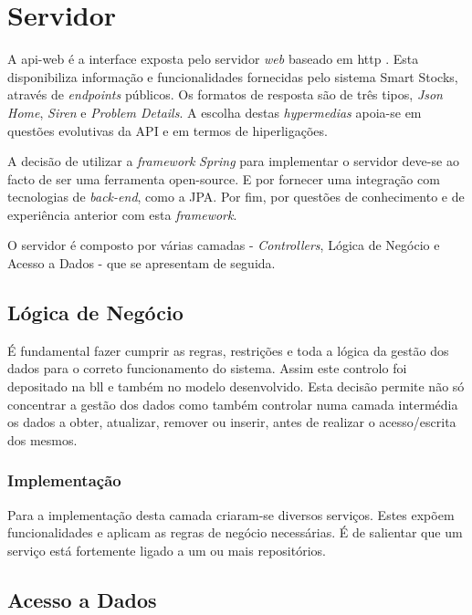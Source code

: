 \section{Servidor}\label{sec42}

A \gls{api-web} é a interface exposta pelo servidor \textit{web} baseado em \acrfull{http} \cite{RFC7231:http}. Esta disponibiliza informação e funcionalidades fornecidas pelo sistema Smart Stocks, através de \textit{endpoints} públicos. Os formatos de resposta são de três tipos, \textit{Json Home}, \textit{Siren} e \textit{Problem Details}. A escolha destas \textit{hypermedias} apoia-se em questões evolutivas da API e em termos de hiperligações.

A decisão de utilizar a \textit{framework} \textit{Spring} para implementar o servidor deve-se ao facto de ser uma ferramenta \gls{open-source}. E por fornecer uma integração com tecnologias de \textit{back-end}, como a JPA. Por fim, por questões de conhecimento e de experiência anterior com esta \textit{framework}. 

O servidor é composto por várias camadas - \textit{Controllers}, Lógica de Negócio e Acesso a Dados - que se apresentam de seguida.

%
%
\subsection{Lógica de Negócio}\label{subsec421}

É fundamental fazer cumprir as regras, restrições e toda a lógica da gestão dos dados para o correto funcionamento do sistema. Assim  este controlo foi depositado na \acrfull{bll} e também no modelo desenvolvido. Esta decisão permite não só concentrar a gestão dos dados como também controlar numa camada intermédia os dados a obter, atualizar, remover ou inserir, antes de realizar o acesso/escrita dos mesmos. 

\subsubsection{Implementação}\label{subsubsec4211}

Para a implementação desta camada criaram-se diversos serviços. Estes expõem funcionalidades e aplicam as regras de negócio necessárias. É de salientar que um serviço está fortemente ligado a um ou mais repositórios. 

%
%
\subsection{Acesso a Dados}\label{subsec422}

